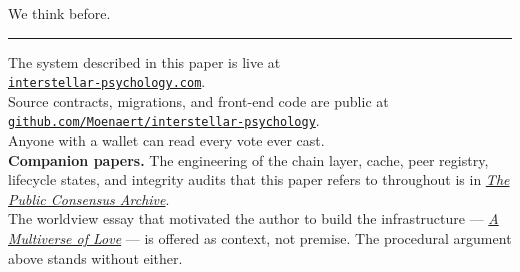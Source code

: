 \documentclass[11pt,a4paper]{article}
\begin{document}
We think before.

\vspace{2em}
\hrule
\vspace{1em}

\begin{center}
\small
The system described in this paper is live at\\
\href{https://interstellar-psychology.com/}{\texttt{interstellar-psychology.com}}.\\
Source contracts, migrations, and front-end code are public at\\
\href{https://github.com/Moenaert/interstellar-psychology}{\texttt{github.com/Moenaert/interstellar-psychology}}.\\
Anyone with a wallet can read every vote ever cast.\\[0.8em]
\textbf{Companion papers.}
The engineering of the chain layer, cache, peer registry, lifecycle
states, and integrity audits that this paper refers to throughout
is in
\href{https://interstellar-psychology.com/artefacts/blockchain/archive.pdf}{\textit{The Public Consensus Archive}}.\\
The worldview essay that motivated the author to build the
infrastructure ---
\href{https://interstellar-psychology.com/artefacts/blockchain/whitepaper.pdf}{\textit{A Multiverse of Love}} ---
is offered as context, not premise. The procedural argument above
stands without either.
\end{center}
\end{document}
